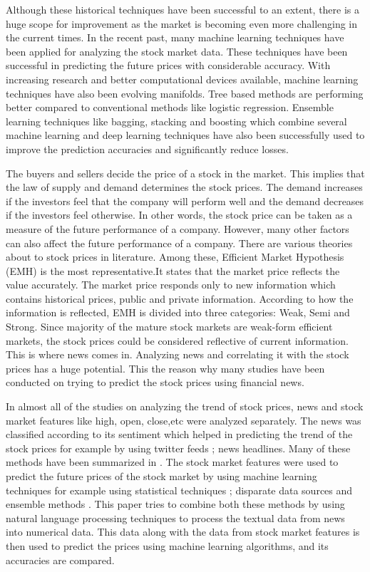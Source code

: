 \documentclass[preprint,12pt]{elsarticle}
\begin{document}
Although these historical techniques have been successful to an extent, there is a huge scope for improvement as the market is becoming even more challenging in the current times. In the recent past, many machine learning techniques have been applied for analyzing the stock market data. These techniques have been successful in predicting the future prices with considerable accuracy. With increasing research and better computational devices available, machine learning techniques have also been evolving manifolds. Tree based methods are performing better compared to conventional methods like logistic regression. Ensemble learning techniques like bagging, stacking and boosting which combine several machine learning and deep learning techniques have also been successfully used to improve the prediction accuracies and significantly reduce losses.

The buyers and sellers decide the price of a stock in the market. This implies that the law of supply and demand determines the stock prices. The demand increases if the investors feel that the company will perform well and the demand decreases if the investors feel otherwise. In other words, the stock price can be taken as a measure of the future performance of a company. However, many other factors can also affect the future performance of a company. There are various theories about to stock prices in literature. Among these, Efficient Market Hypothesis (EMH) \cite{emh} is the most representative.It states that the market price reflects the value accurately. The market price responds only to new information which contains historical prices, public and private information. According to how the information is reflected, EMH is divided into three categories: Weak, Semi and Strong. Since majority of the mature stock markets are weak-form efficient markets, the stock prices could be considered reflective of current information. This is where news comes in. Analyzing news and correlating it with the stock prices has a huge potential. This the reason why many studies have been conducted on trying to predict the stock prices using financial news. 

In almost all of the studies on analyzing the trend of stock prices, news and stock market features like high, open, close,etc were analyzed separately. The news was classified according to its sentiment which helped in predicting the trend of the stock prices for example by using twitter feeds \cite{text_1}; news headlines\cite{text_2}. Many of these methods have been summarized in \cite{text_3}. The stock market features were used to predict the future prices of the stock market by using machine learning techniques for example using statistical techniques \cite{stock_1}; disparate data sources \cite{stock_2} and ensemble methods \cite{stock_3}.
This paper tries to combine both these methods by using natural language processing techniques to process the textual data from news into numerical data. This data along with the data from stock market features is then used to predict the prices using machine learning algorithms, and its accuracies are compared.
\end{document}

